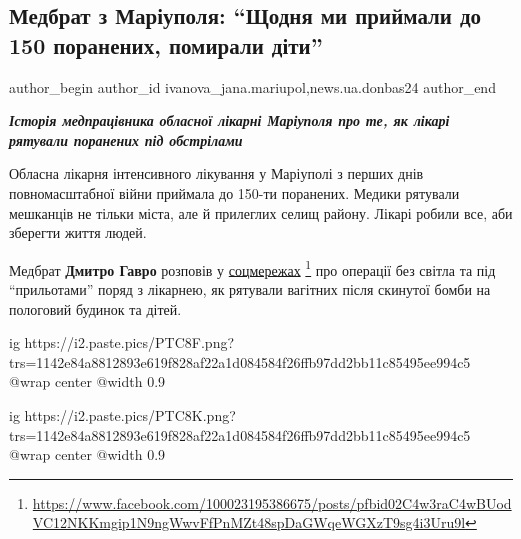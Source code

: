  
 
 
 
 
 
\subsection{Медбрат з Маріуполя: \enquote{Щодня ми приймали до 150 поранених, помирали діти}}
\label{sec:13_08_2022.stz.news.ua.donbas24.3.medbrat_z_mrpl}
 
\ifcmt
 author_begin
   author_id ivanova_jana.mariupol,news.ua.donbas24
 author_end
\fi

\begin{center}
  \em\bfseries\Large
Історія медпрацівника обласної лікарні Маріуполя про те, як лікарі рятували
поранених під обстрілами
\end{center}

Обласна лікарня інтенсивного лікування у Маріуполі з перших днів
повномасштабної війни приймала до 150-ти поранених. Медики рятували мешканців
не тільки міста, але й прилеглих селищ району. Лікарі робили все, аби зберегти
життя людей.

Медбрат \textbf{Дмитро Гавро} розповів у \href{https://www.facebook.com/100023195386675/posts/pfbid02C4w3raC4wBUodVC12NKKmgip1N9ngWwvFfPnMZt48spDaGWqeWGXzT9sg4i3Uru9l}{соцмережах}%
\footnote{\url{https://www.facebook.com/100023195386675/posts/pfbid02C4w3raC4wBUodVC12NKKmgip1N9ngWwvFfPnMZt48spDaGWqeWGXzT9sg4i3Uru9l}}
про операції без світла та під \enquote{прильотами} поряд з лікарнею, як рятували вагітних після скинутої бомби на
пологовий будинок та дітей.

\ifcmt
  ig https://i2.paste.pics/PTC8F.png?trs=1142e84a8812893e619f828af22a1d084584f26ffb97dd2bb11c85495ee994c5
  @wrap center
  @width 0.9
\fi

\ifcmt
  ig https://i2.paste.pics/PTC8K.png?trs=1142e84a8812893e619f828af22a1d084584f26ffb97dd2bb11c85495ee994c5
  @wrap center
  @width 0.9
\fi

